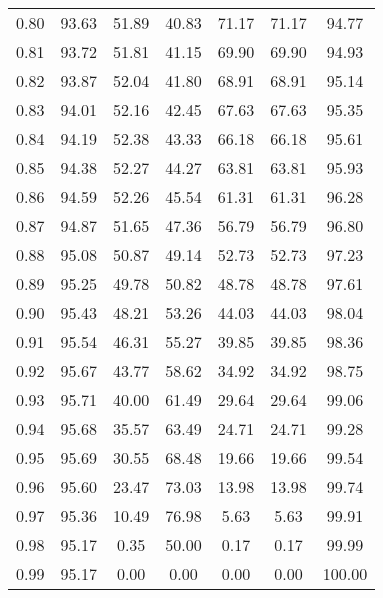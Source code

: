 \begin{tabular}{|c|c|c|c|c|c|c|}
      0.80 &     93.63 &     51.89 &      40.83 &   71.17 &      71.17 &         94.77 \\
      0.81 &     93.72 &     51.81 &      41.15 &   69.90 &      69.90 &         94.93 \\
      0.82 &     93.87 &     52.04 &      41.80 &   68.91 &      68.91 &         95.14 \\
      0.83 &     94.01 &     52.16 &      42.45 &   67.63 &      67.63 &         95.35 \\
      0.84 &     94.19 &     52.38 &      43.33 &   66.18 &      66.18 &         95.61 \\
      0.85 &     94.38 &     52.27 &      44.27 &   63.81 &      63.81 &         95.93 \\
      0.86 &     94.59 &     52.26 &      45.54 &   61.31 &      61.31 &         96.28 \\
      0.87 &     94.87 &     51.65 &      47.36 &   56.79 &      56.79 &         96.80 \\
      0.88 &     95.08 &     50.87 &      49.14 &   52.73 &      52.73 &         97.23 \\
      0.89 &     95.25 &     49.78 &      50.82 &   48.78 &      48.78 &         97.61 \\
      0.90 &     95.43 &     48.21 &      53.26 &   44.03 &      44.03 &         98.04 \\
      0.91 &     95.54 &     46.31 &      55.27 &   39.85 &      39.85 &         98.36 \\
      0.92 &     95.67 &     43.77 &      58.62 &   34.92 &      34.92 &         98.75 \\
      0.93 &     95.71 &     40.00 &      61.49 &   29.64 &      29.64 &         99.06 \\
      0.94 &     95.68 &     35.57 &      63.49 &   24.71 &      24.71 &         99.28 \\
      0.95 &     95.69 &     30.55 &      68.48 &   19.66 &      19.66 &         99.54 \\
      0.96 &     95.60 &     23.47 &      73.03 &   13.98 &      13.98 &         99.74 \\
      0.97 &     95.36 &     10.49 &      76.98 &    5.63 &       5.63 &         99.91 \\
      0.98 &     95.17 &      0.35 &      50.00 &    0.17 &       0.17 &         99.99 \\
      0.99 &     95.17 &      0.00 &       0.00 &    0.00 &       0.00 &        100.00 \\
\bottomrule
\end{tabular}
